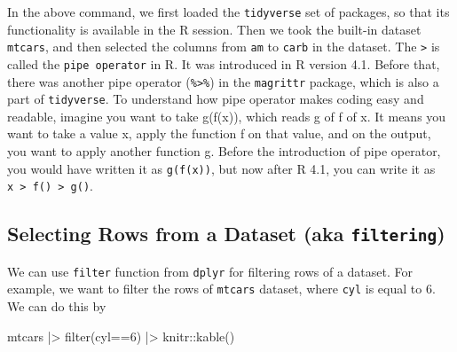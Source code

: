\documentclass[
  letterpaper,
  paper =a4,
  twoside,
  openright,
  headsepline,
  footsepline,
  listof = totocnumbered,
  chapterprefix = true,
  firstiscover]{scrbook}
\newenvironment{Shaded}{\begin{snugshade}}{\end{snugshade}}
\newcommand{\DecValTok}[1]{\textcolor[rgb]{0.68,0.00,0.00}{#1}}
\newcommand{\FunctionTok}[1]{\textcolor[rgb]{0.28,0.35,0.67}{#1}}
\newcommand{\NormalTok}[1]{\textcolor[rgb]{0.00,0.23,0.31}{#1}}
\newcommand{\SpecialCharTok}[1]{\textcolor[rgb]{0.37,0.37,0.37}{#1}}
\begin{document}
In the above command, we first loaded the \texttt{tidyverse} set of
packages, so that its functionality is available in the R session. Then
we took the built-in dataset \texttt{mtcars}, and then selected the
columns from \texttt{am} to \texttt{carb} in the dataset. The
\texttt{\textbar{}\textgreater{}} is called the \texttt{pipe\ operator}
in R. It was introduced in R version 4.1. Before that, there was another
pipe operator (\texttt{\%\textgreater{}\%}) in the \texttt{magrittr}
package, which is also a part of \texttt{tidyverse}. To understand how
pipe operator makes coding easy and readable, imagine you want to take
g(f(x)), which reads g of f of x. It means you want to take a value x,
apply the function f on that value, and on the output, you want to apply
another function g. Before the introduction of pipe operator, you would
have written it as \texttt{g(f(x))}, but now after R 4.1, you can write
it as
\texttt{x\ \textbar{}\textgreater{}\ f()\ \textbar{}\textgreater{}\ g()}.

\hypertarget{selecting-rows-from-a-dataset-aka-filtering}{%
\subsection{\texorpdfstring{Selecting Rows from a Dataset (aka
\texttt{filtering})}{Selecting Rows from a Dataset (aka filtering)}}\label{selecting-rows-from-a-dataset-aka-filtering}}

We can use \texttt{filter} function from \texttt{dplyr} for filtering
rows of a dataset. For example, we want to filter the rows of
\texttt{mtcars} dataset, where \texttt{cyl} is equal to 6. We can do
this by

\begin{Shaded}
\begin{Highlighting}[numbers=left,,]
\NormalTok{mtcars }\SpecialCharTok{|\textgreater{}} \FunctionTok{filter}\NormalTok{(cyl}\SpecialCharTok{==}\DecValTok{6}\NormalTok{) }\SpecialCharTok{|\textgreater{}}\NormalTok{ knitr}\SpecialCharTok{::}\FunctionTok{kable}\NormalTok{()}
\end{Highlighting}
\end{Shaded}
\end{document}
